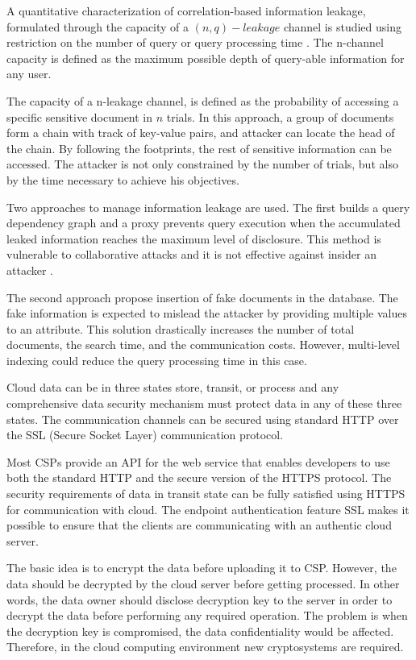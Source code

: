 A quantitative characterization of correlation-based information leakage, formulated through the capacity of a $(n,q)-leakage$ channel is studied using restriction on the number of query or query processing time \cite{4221659}. The n-channel capacity is defined as the maximum possible depth of query-able information for any user. 

The capacity of a n-leakage channel, is defined as the probability of accessing a specific sensitive document in $n$ trials. In this approach, a group of documents form a chain with track of key-value pairs, and attacker can locate the head of the chain. By following the footprints, the rest of sensitive information can be accessed. The attacker is not only constrained by the number of trials, but also by the time necessary to achieve his objectives.

Two approaches to manage information leakage are used. The first builds a query dependency graph and a proxy prevents query execution when the accumulated leaked information reaches the maximum level of disclosure. This method is vulnerable to collaborative attacks and it is not effective against insider an attacker \cite{4221659}.

The second approach propose insertion of fake documents in the database. The fake information is expected to mislead the attacker by providing multiple values to an attribute. This solution drastically increases the number of total documents, the search time, and the communication costs\cite{whang2010managing}. However, multi-level indexing could reduce the query processing time in this case.

\medskip

 Cloud data can be in three states store, transit, or process and any comprehensive data security mechanism must protect data in any of these three states. The communication channels can be secured using standard HTTP over the SSL (Secure Socket Layer) communication protocol. 

Most CSPs provide an API for the web service that enables developers to use both the standard HTTP and the secure version of the HTTPS protocol. The security requirements of data in transit state can be fully satisfied using HTTPS for communication with cloud. The endpoint authentication feature SSL makes it possible to ensure that the clients are communicating with an authentic cloud server.

The basic idea is to encrypt the data before uploading it to CSP. However, the data should be decrypted by the cloud server before getting processed. In other words, the data owner should disclose decryption key to the server in order to decrypt the data before performing any required operation. The problem is when the decryption key is compromised, the data confidentiality would be affected. Therefore, in the cloud computing environment new cryptosystems are required. 

